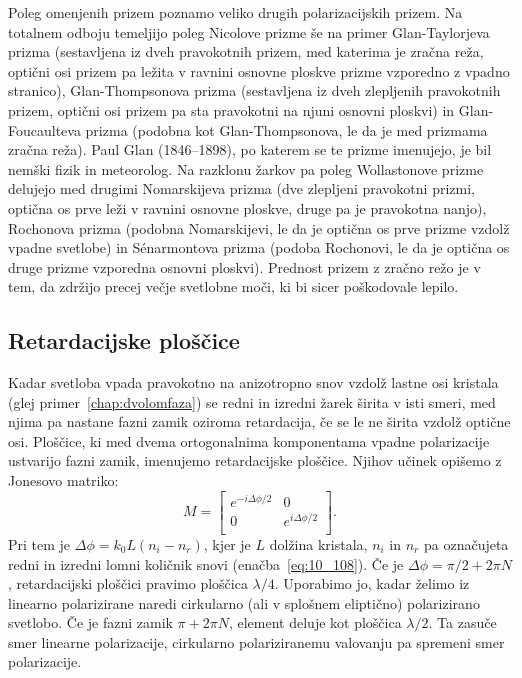 \begin{remark}
Poleg omenjenih prizem poznamo veliko drugih polarizacijskih prizem. Na totalnem odboju temeljijo
poleg Nicolove prizme še na primer Glan-Taylorjeva prizma 
(sestavljena iz dveh pravokotnih prizem, 
med katerima je zračna reža, optični osi prizem pa ležita v ravnini osnovne ploskve prizme vzporedno 
z vpadno stranico), Glan-Thompsonova prizma
(sestavljena iz dveh zlepljenih pravokotnih prizem, 
optični osi prizem pa sta pravokotni na njuni osnovni ploskvi) in Glan-Foucaulteva prizma 
(podobna kot Glan-Thompsonova, le da je med prizmama zračna reža). Paul Glan (1846--1898),
po katerem se te prizme imenujejo, je bil nemški fizik in meteorolog. Na razklonu žarkov
pa poleg Wollastonove prizme delujejo med drugimi Nomarskijeva prizma (dve zlepljeni 
pravokotni prizmi, 
optična os prve leži v ravnini osnovne ploskve, druge pa je pravokotna nanjo), 
Rochonova prizma (podobna Nomarskijevi, le da je optična 
os prve prizme vzdolž vpadne svetlobe) in S\'enarmontova prizma (podoba Rochonovi, le da je optična os druge prizme vzporedna osnovni ploskvi). Prednost
prizem z zračno režo je v tem, da zdržijo precej večje svetlobne moči, ki bi sicer poškodovale lepilo.
\end{remark}

\subsection*{Retardacijske ploščice}
Kadar svetloba vpada pravokotno na anizotropno snov vzdolž lastne osi kristala 
(glej primer~\ref{chap:dvolomfaza}) se redni in 
izredni žarek širita v isti smeri, med njima pa nastane fazni zamik oziroma retardacija, če se le 
ne širita vzdolž optične osi.
Ploščice, ki med dvema ortogonalnima komponentama vpadne polarizacije ustvarijo
fazni zamik, imenujemo retardacijske ploščice. Njihov učinek opišemo z Jonesovo matriko:
\begin{equation}
M = 
\left[\begin{array}{cc}
e^{-i\Delta \phi/2} & 0\\
0 & e^{i\Delta \phi/2}\\
\end{array}\right]\!\!.
\label{eq:10_120}
\end{equation}
Pri tem je $\Delta \phi = k_0 L (n_i-n_r)$, kjer je $L$ dolžina kristala, $n_i$ in $n_r$
pa označujeta redni in izredni lomni količnik snovi (enačba~\ref{eq:10_108}). 
Če je $\Delta \phi= \pi/2 + 2\pi N$, retardacijski ploščici pravimo ploščica $\lambda/4$. 
Uporabimo jo, kadar želimo iz linearno polarizirane naredi cirkularno (ali v splošnem eliptično)
polarizirano svetlobo.
Če je fazni zamik $\pi + 2\pi N$, element deluje kot ploščica $\lambda/2$. Ta zasuče smer 
linearne polarizacije, cirkularno polariziranemu valovanju pa spremeni smer polarizacije.

